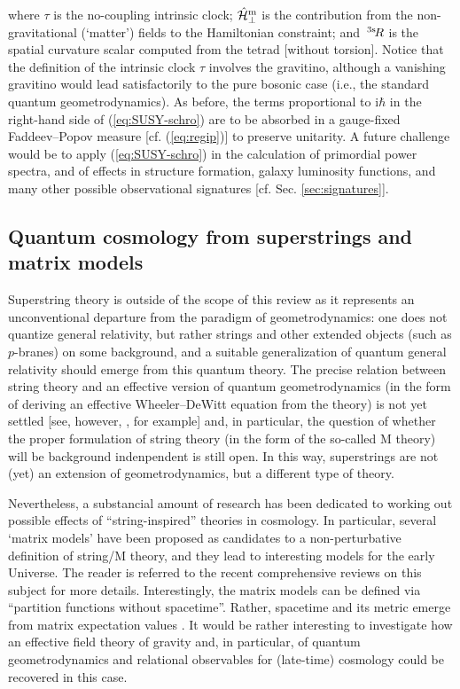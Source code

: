 \documentclass[12pt]{iopart}
\def\eref#1{(\ref{eq:#1})}
\def\I{\mathrm{i}}
\newcommand{\threesR}{{\,}^{\rm{3s}}\hspace{-0.5mm}R} %
\newcommand{\Hmbot}{{\hat{\mathcal{H}}^{\rm{m}}_\bot}}
\begin{document}
where $\tau$ is the no-coupling intrinsic clock; $\Hmbot$ is the contribution from the non-gravitational (‘matter’) fields to  the Hamiltonian constraint; and $\threesR$ is the spatial curvature scalar computed from the tetrad  [without torsion]. Notice that the definition of the intrinsic clock $\tau$ involves the  gravitino, although  a vanishing gravitino would lead satisfactorily to  the pure bosonic case (i.e., the standard quantum geometrodynamics). As before, the terms proportional to $\I\hbar$ in the right-hand side of \eref{SUSY-schro} are to be absorbed in a gauge-fixed Faddeev--Popov measure [cf. \eref{regip}] to preserve unitarity. A future challenge would be to apply \eref{SUSY-schro} in the calculation of primordial power spectra, and of effects in structure formation, galaxy luminosity functions, and many other possible observational signatures [cf. Sec. \ref{sec:signatures}].

\subsection{Quantum cosmology from superstrings and matrix models}
Superstring theory is outside of the scope of this review as it represents an unconventional departure from the paradigm of geometrodynamics: one does not quantize general relativity, but rather strings and other extended objects (such as $p$-branes) on some background, and a suitable generalization of quantum general relativity should emerge from this quantum theory. The precise relation between string theory and an effective version of quantum geometrodynamics (in the form of deriving an effective Wheeler--DeWitt equation from the theory) is not yet settled [see, however, \citet{Lifschytz:2000bj,Araujo-Regado:2022gvw}, for example] and, in particular, the question of whether the proper formulation of string theory (in the form of the so-called M theory) will be background indenpendent is still open. In this way, superstrings are not (yet) an extension of geometrodynamics, but a different type of theory.

Nevertheless, a substancial amount of research has been dedicated to working out possible effects of ``string-inspired'' theories in cosmology. In particular, several `matrix models' have been proposed as candidates to a non-perturbative definition of string/M theory, and they lead to interesting models for the early Universe. The reader is referred to the recent comprehensive reviews \citet{Cicoli:2023opf,Brandenberger:2023ver} on this subject for more details. Interestingly, the matrix models can be defined via ``partition functions without spacetime''. Rather, spacetime and its metric emerge from matrix expectation values \citep{Brandenberger:2023ver}. It would be rather interesting to investigate how an effective field theory of gravity and, in particular, of quantum geometrodynamics and relational observables for (late-time) cosmology could be recovered in this case. 
\end{document}
